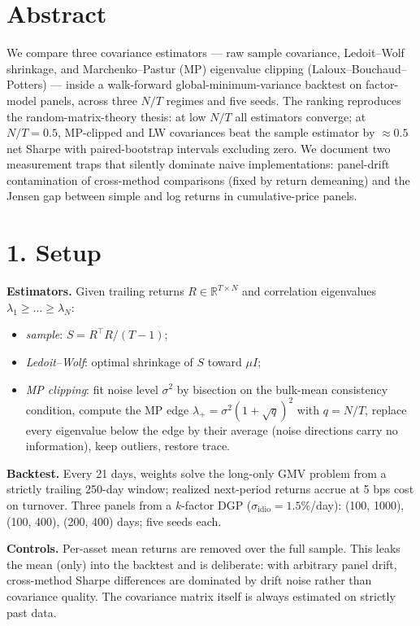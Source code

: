\section{Abstract}\label{abstract}

We compare three covariance estimators --- raw sample covariance,
Ledoit--Wolf shrinkage, and Marchenko--Pastur (MP) eigenvalue clipping
(Laloux--Bouchaud-- Potters) --- inside a walk-forward
global-minimum-variance backtest on factor-model panels, across three
\(N/T\) regimes and five seeds. The ranking reproduces the
random-matrix-theory thesis: at low \(N/T\) all estimators converge; at
\(N/T = 0.5\), MP-clipped and LW covariances beat the sample estimator
by \(\approx 0.5\) net Sharpe with paired-bootstrap intervals excluding
zero. We document two measurement traps that silently dominate naive
implementations: panel-drift contamination of cross-method comparisons
(fixed by return demeaning) and the Jensen gap between simple and log
returns in cumulative-price panels.

\section{1. Setup}\label{setup}

\textbf{Estimators.} Given trailing returns
\(R \in \mathbb{R}^{T \times N}\) and correlation eigenvalues
\(\lambda_1 \ge \dots \ge \lambda_N\):

\begin{itemize}
\tightlist
\item
  \emph{sample}: \(S = R^\top R / (T-1)\);
\item
  \emph{Ledoit--Wolf}: optimal shrinkage of \(S\) toward \(\mu I\);
\item
  \emph{MP clipping}: fit noise level \(\sigma^2\) by bisection on the
  bulk-mean consistency condition, compute the MP edge
  \(\lambda_+ = \sigma^2(1 + \sqrt{q})^2\) with \(q = N/T\), replace
  every eigenvalue below the edge by their average (noise directions
  carry no information), keep outliers, restore trace.
\end{itemize}

\textbf{Backtest.} Every 21 days, weights solve the long-only GMV
problem from a strictly trailing 250-day window; realized next-period
returns accrue at 5 bps cost on turnover. Three panels from a
\(k\)-factor DGP (\(\sigma_{\text{idio}} = 1.5\%\)/day): (100, 1000),
(100, 400), (200, 400) days; five seeds each.

\textbf{Controls.} Per-asset mean returns are removed over the full
sample. This leaks the mean (only) into the backtest and is deliberate:
with arbitrary panel drift, cross-method Sharpe differences are
dominated by drift noise rather than covariance quality. The covariance
matrix itself is always estimated on strictly past data.

